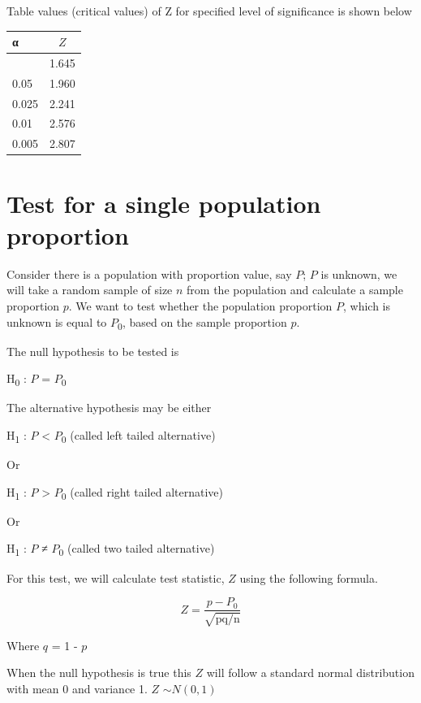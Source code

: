 \documentclass[
]{book}
\begin{document}
Table values (critical values) of Z for specified level of significance is shown below

\begin{longtable}[]{@{}lc@{}}
\toprule\noalign{}
\textbf{α} & \(Z\) \\
\midrule\noalign{}
\endhead
\bottomrule\noalign{}
\endlastfoot
0.10 & 1.645 \\
0.05 & 1.960 \\
0.025 & 2.241 \\
0.01 & 2.576 \\
0.005 & 2.807 \\
\end{longtable}

\hypertarget{test-for-a-single-population-proportion}{%
\section{Test for a single population proportion}\label{test-for-a-single-population-proportion}}

Consider there is a population with proportion value, say \(P\); \(P\) is
unknown, we will take a random sample of size \(n\) from the population
and calculate a sample proportion \(p\). We want to test whether the
population proportion \(P\), which is unknown is equal to \(P\)\textsubscript{0}, based on
the sample proportion \(p\).

The null hypothesis to be tested is

H\textsubscript{0} : \(P\) = \(P\)\textsubscript{0}

The alternative hypothesis may be either

H\textsubscript{1} : \(P\) \textless{} \(P\)\textsubscript{0} (called left tailed alternative)

Or

H\textsubscript{1} : \(P\) \textgreater{} \(P\)\textsubscript{0} (called right tailed alternative)

Or

H\textsubscript{1} : \(P\) ≠ \(P\)\textsubscript{0} (called two tailed alternative)

For this test, we will calculate test statistic, \(Z\) using the following
formula.

\[Z = \frac{p - P_{0}}{\sqrt{\text{pq/n}}}\]

Where \(q\) = 1 - \(p\)

When the null hypothesis is true this \(Z\) will follow a standard normal distribution with mean 0 and variance 1. \(Z\) \(\sim N(0,1)\)
\end{document}
